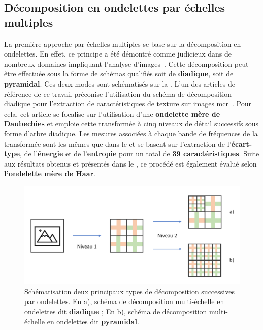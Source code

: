 \subsection{Décomposition en ondelettes par échelles multiples}
La première approche par échelles multiples se base sur la décomposition en ondelettes. En effet, ce principe a été démontré comme judicieux dans de nombreux domaines impliquant l'analyse d'images~\cite{Carvalho2004}. Cette décomposition peut être effectuée sous la forme de schémas qualifiés soit de \textbf{diadique}, soit de \textbf{pyramidal}. Ces deux modes sont schématisés sur la . L'un des articles de référence de ce travail préconise l'utilisation du schéma de décomposition diadique pour l'extraction de caractéristiques de texture sur images \gls{mcr}~\cite{Wiltgen2008}. Pour cela, cet article se focalise sur l'utilisation d'une \textbf{ondelette mère de Daubechies} et emploie cette transformée à cinq niveaux de détail successifs sous forme d'arbre diadique. Les mesures associées à chaque bande de fréquences de la transformée sont les mêmes que dans le  et se basent sur l'extraction de l'\textbf{écart-type}, de l'\textbf{énergie} et de l'\textbf{entropie} pour un total de \textbf{39 caractéristiques}. Suite aux résultats obtenus et présentés dans le , ce procédé est également évalué selon \textbf{l'ondelette mère de Haar}.\par

\begin{figure}[H]
    \centering
    \includegraphics[width=\textwidth]{contents/chapter_6/resources/scheme_image_improvement_dwt_decomposition.pdf}
    \caption{Schématisation deux principaux types de décomposition successives par ondelettes. En a), schéma de décomposition multi-échelle en ondelettes dit \textbf{diadique} ; En b), schéma de décomposition multi-échelle en ondelettes dit \textbf{pyramidal}.}
    \label{fig:scheme_image_improvement_dwt_decomposition}
\end{figure}\par

